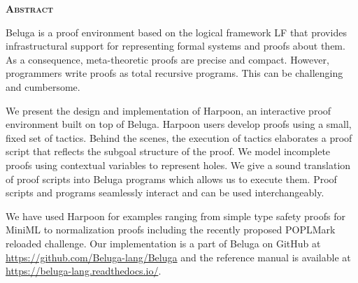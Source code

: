 \begin{center}
  \bfseries\textsc{Abstract}
\end{center}

Beluga is a proof environment based on the logical framework LF that provides
infrastructural support for representing formal systems and proofs about them.
As a consequence, meta-theoretic proofs are precise and compact. However,
programmers write proofs as total recursive programs. This can be challenging
and cumbersome.

We present the design and implementation of Harpoon, an interactive proof
environment built on top of Beluga. Harpoon users develop proofs using a small,
fixed set of tactics. Behind the scenes, the execution of tactics elaborates a
proof script that reflects the subgoal structure of the proof. We model
incomplete proofs using contextual variables to represent holes.
We give a sound translation of proof scripts into Beluga programs which allows
us to execute them. Proof scripts and programs seamlessly interact and can be
used interchangeably.

We have used Harpoon for examples ranging from simple type safety proofs for
MiniML to normalization proofs including the recently proposed POPLMark reloaded
challenge.
Our implementation is a part of Beluga on GitHub at
\url{https://github.com/Beluga-lang/Beluga} and the reference manual is
available at \url{https://beluga-lang.readthedocs.io/}.

\vfill



